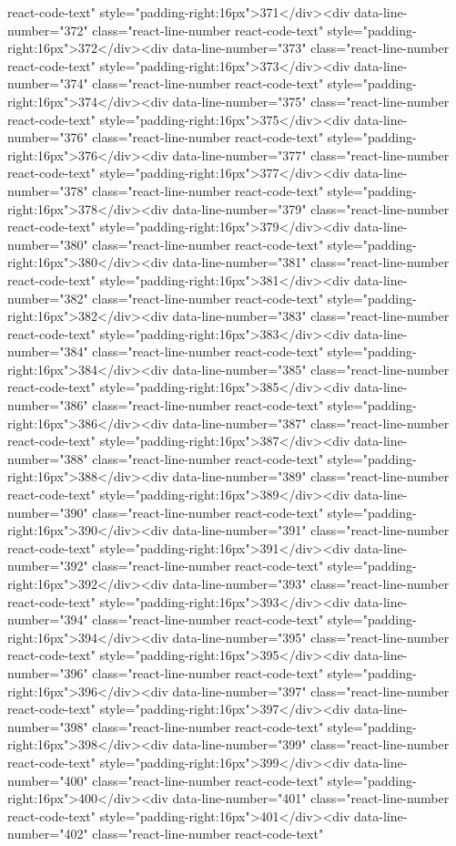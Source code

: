 react-code-text" style="padding-right:16px">371</div><div data-line-number="372" class="react-line-number react-code-text" style="padding-right:16px">372</div><div data-line-number="373" class="react-line-number react-code-text" style="padding-right:16px">373</div><div data-line-number="374" class="react-line-number react-code-text" style="padding-right:16px">374</div><div data-line-number="375" class="react-line-number react-code-text" style="padding-right:16px">375</div><div data-line-number="376" class="react-line-number react-code-text" style="padding-right:16px">376</div><div data-line-number="377" class="react-line-number react-code-text" style="padding-right:16px">377</div><div data-line-number="378" class="react-line-number react-code-text" style="padding-right:16px">378</div><div data-line-number="379" class="react-line-number react-code-text" style="padding-right:16px">379</div><div data-line-number="380" class="react-line-number react-code-text" style="padding-right:16px">380</div><div data-line-number="381" class="react-line-number react-code-text" style="padding-right:16px">381</div><div data-line-number="382" class="react-line-number react-code-text" style="padding-right:16px">382</div><div data-line-number="383" class="react-line-number react-code-text" style="padding-right:16px">383</div><div data-line-number="384" class="react-line-number react-code-text" style="padding-right:16px">384</div><div data-line-number="385" class="react-line-number react-code-text" style="padding-right:16px">385</div><div data-line-number="386" class="react-line-number react-code-text" style="padding-right:16px">386</div><div data-line-number="387" class="react-line-number react-code-text" style="padding-right:16px">387</div><div data-line-number="388" class="react-line-number react-code-text" style="padding-right:16px">388</div><div data-line-number="389" class="react-line-number react-code-text" style="padding-right:16px">389</div><div data-line-number="390" class="react-line-number react-code-text" style="padding-right:16px">390</div><div data-line-number="391" class="react-line-number react-code-text" style="padding-right:16px">391</div><div data-line-number="392" class="react-line-number react-code-text" style="padding-right:16px">392</div><div data-line-number="393" class="react-line-number react-code-text" style="padding-right:16px">393</div><div data-line-number="394" class="react-line-number react-code-text" style="padding-right:16px">394</div><div data-line-number="395" class="react-line-number react-code-text" style="padding-right:16px">395</div><div data-line-number="396" class="react-line-number react-code-text" style="padding-right:16px">396</div><div data-line-number="397" class="react-line-number react-code-text" style="padding-right:16px">397</div><div data-line-number="398" class="react-line-number react-code-text" style="padding-right:16px">398</div><div data-line-number="399" class="react-line-number react-code-text" style="padding-right:16px">399</div><div data-line-number="400" class="react-line-number react-code-text" style="padding-right:16px">400</div><div data-line-number="401" class="react-line-number react-code-text" style="padding-right:16px">401</div><div data-line-number="402" class="react-line-number react-code-text" 
